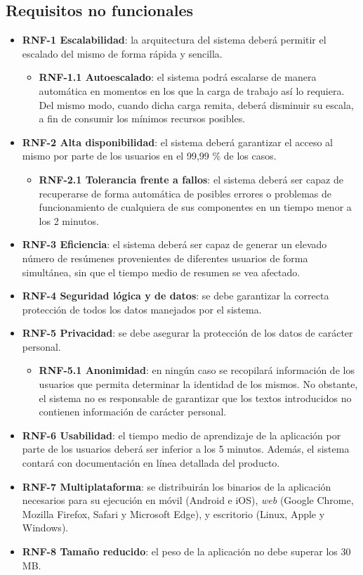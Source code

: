 \subsection{Requisitos no funcionales}

\begin{itemize}[\textbullet]
	\item \textbf{RNF-1 Escalabilidad}: la arquitectura del sistema deberá permitir el escalado del mismo de forma rápida y sencilla.
	\begin{itemize}[◦]
		\item \textbf{RNF-1.1 Autoescalado}: el sistema podrá escalarse de manera automática en momentos en los que la carga de trabajo así lo requiera. Del mismo modo, cuando dicha carga remita, deberá disminuir su escala, a fin de consumir los mínimos recursos posibles.
	\end{itemize}
	\item \textbf{RNF-2 Alta disponibilidad}: el sistema deberá garantizar el acceso al mismo por parte de los usuarios en el 99,99 \% de los casos.
	\begin{itemize}[◦]
		\item \textbf{RNF-2.1 Tolerancia frente a fallos}: el sistema deberá ser capaz de recuperarse de forma automática de posibles errores o problemas de funcionamiento de cualquiera de sus componentes en un tiempo menor a los 2 minutos.
	\end{itemize}
	\item \textbf{RNF-3 Eficiencia}: el sistema deberá ser capaz de generar un elevado número de resúmenes provenientes de diferentes usuarios de forma simultánea, sin que el tiempo medio de resumen se vea afectado.
	\item \textbf{RNF-4 Seguridad lógica y de datos}: se debe garantizar la correcta protección de todos los datos manejados por el sistema.
	\item \textbf{RNF-5 Privacidad}: se debe asegurar la protección de los datos de carácter personal.
	\begin{itemize}[◦]
		\item \textbf{RNF-5.1 Anonimidad}: en ningún caso se recopilará información de los usuarios que permita determinar la identidad de los mismos. No obstante, el sistema no es responsable de garantizar que los textos introducidos no contienen información de carácter personal.
	\end{itemize}
	\item \textbf{RNF-6 Usabilidad}: el tiempo medio de aprendizaje de la aplicación por parte de los usuarios deberá ser inferior a los 5 minutos. Además, el sistema contará con documentación en línea detallada del producto.
	\item \textbf{RNF-7 Multiplataforma}: se distribuirán los binarios de la aplicación necesarios para su ejecución en móvil (Android e iOS), \emph{web} (Google Chrome, Mozilla Firefox, Safari y Microsoft Edge), y escritorio (Linux, Apple y Windows).
	\item \textbf{RNF-8 Tamaño reducido}: el peso de la aplicación no debe superar los 30 MB.
\end{itemize}

